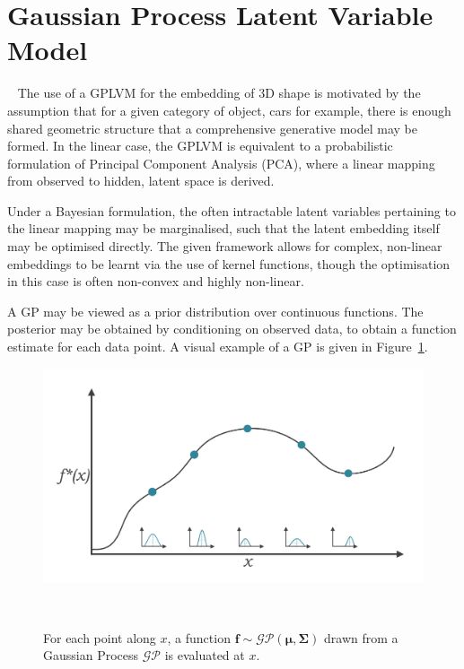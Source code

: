 \section{Gaussian Process Latent Variable Model}
~\label{sec:spp_gplvm}
The use of a GPLVM for the embedding of 3D shape is motivated by the assumption that for a 
given category of object, cars for example, there is enough shared geometric structure that 
a comprehensive generative model may be formed. In the linear case, the GPLVM is equivalent 
to a probabilistic formulation of Principal Component Analysis (PCA), where a linear mapping 
from observed to hidden, latent space is derived. 

Under a Bayesian formulation, the often intractable latent variables pertaining to the linear 
mapping may be marginalised, such that the latent embedding itself may be optimised directly. The 
given framework allows for complex, non-linear embeddings to be learnt via the use of kernel functions, 
though the optimisation in this case is often non-convex and highly non-linear.

A GP may be viewed as a prior distribution over continuous functions. The posterior 
may be obtained by conditioning on observed data, to obtain a function estimate for each data point.
A visual example of a GP is given in Figure~\ref{figure:gp_func_dist}.
\begin{figure}[!htbp]
  \centering
  \includegraphics[width=\linewidth]{figures/spp/gp.pdf}
  \caption[GP as a Distribution Over Functions]{For each point along \( x \), 
  a function \( \bm{f} \sim \mathcal{GP}(\bm{\mu}, \bm{\Sigma}) \) drawn from a Gaussian Process 
  \( \mathcal{GP} \) is evaluated at \( x \).}
~\label{figure:gp_func_dist}
\end{figure}

